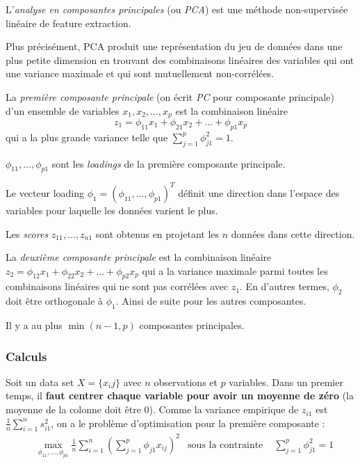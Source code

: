         \begin{definition}
            L'\textit{analyse en composantes principales} (ou \textit{PCA}) est une méthode non-supervisée linéaire de feature extraction.

            Plus précisément, PCA produit une représentation du jeu de données dans une plus petite dimension en trouvant des combinaisons linéaires des variables qui ont une variance maximale et qui sont mutuellement non-corrélées.
        \end{definition}

        \begin{definition}
            La \textit{première composante principale} (on écrit \textit{PC} pour composante principale) d'un ensemble de variables \(x_1, x_2, \dots, x_p\) est la combinaison linéaire
            \[
                z_1 = \phi_{11}x_1 + \phi_{21} x_2 + \dots + \phi_{p1} x_p
            \]
            qui a la plus grande variance telle que \(\sum_{j=1}^p \phi_{j1}^2 = 1\).

            \(\phi_{11}, \dots, \phi_{p1}\) sont les \textit{loadings} de la première composante principale.

            Le vecteur loading \(\phi_1 = (\phi_{11}, \dots, \phi_{p1})^T\) définit une direction dans l'espace des variables pour laquelle les données varient le plus.

            Les \textit{scores} \(z_{11}, \dots, z_{n1}\) sont obtenus en projetant les \(n\) données dans cette direction.

            La \textit{deuxième composante principale} est la combinaison linéaire \(z_{2} = \phi_{12}x_1 + \phi_{22}x_2 + \dots + \phi_{p2}x_p\) qui a la variance maximale parmi toutes les combinaisons linéaires qui ne sont pas corrélées avec \(z_1\). En d'autres termes, \(\phi_2\) doit être orthogonale à \(\phi_1\). Ainsi de suite pour les autres composantes.

            Il y a au plus \(\min(n - 1, p)\) composantes principales.
        \end{definition}

        \subsubsection{Calculs}
            Soit un data set \(X = \{x_ij\}\) avec \(n\) observations et \(p\) variables. Dans un premier temps, il \textbf{faut centrer chaque variable pour avoir un moyenne de zéro} (la moyenne de la colonne doit être 0). Comme la variance empirique de \(z_{i1}\) est \(\frac{1}{n} \sum_{i=1}^n s_{i1}^2\), on a le problème d'optimisation pour la première composante :
            \begin{align*}
                &\max_{\phi_{11}, \dots, \phi_{p1}} \frac{1}{n} \sum_{i=1}^n \left(\sum_{j=1}^p \phi_{j1} x_{ij}\right)^2 & \text{sous la contrainte } &\sum_{j=1}^p \phi_{j1}^2 = 1
            \end{align*}

